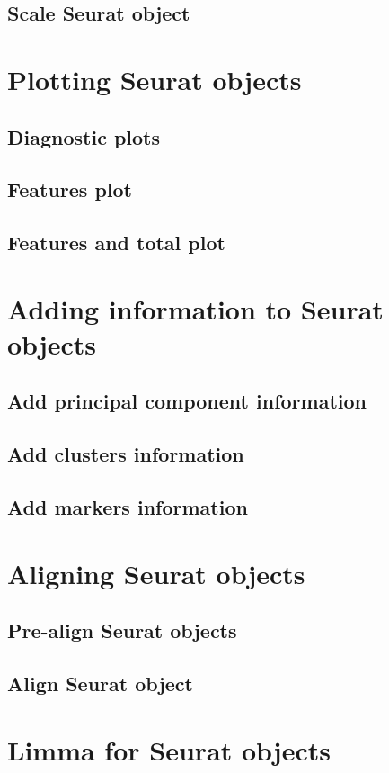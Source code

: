 \subsection{Scale Seurat object}

\section{Plotting Seurat objects}
\subsection{Diagnostic plots}
\subsection{Features plot}
\subsection{Features and total plot}

\section{Adding information to Seurat objects}
\subsection{Add principal component information}
\subsection{Add clusters information}
\subsection{Add markers information}

\section{Aligning Seurat objects}
\subsection{Pre-align Seurat objects}
\subsection{Align Seurat object}

\section{Limma for Seurat objects}
